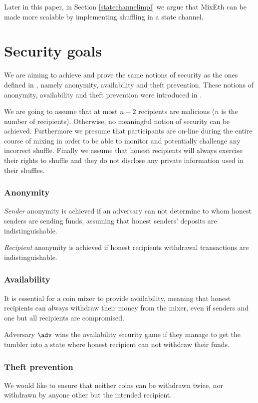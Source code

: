 \documentclass[a4paper]{article}
\theoremstyle{definition}
\begin{document}
Later in this paper, in Section \ref{statechannelimpl} we argue that MixEth can be made more scalable by implementing shuffling in a state channel.   

\section{Security goals} \label{securitygoals}
We are aiming to achieve and prove the same notions of security as the ones defined in \cite{meiklejohn2018mobius}, namely anonymity, availability and theft prevention. These notions of anonymity, availability and theft prevention were introduced in \cite{meiklejohn2018mobius}.

We are going to assume that at most $n-2$ recipients are malicious ($n$ is the number of recipients). Otherwise, no meaningful notion of security can be achieved. Furthermore we presume that participants are on-line during the entire course of mixing in order to be able to monitor and potentially challenge any incorrect shuffle. Finally we assume that honest recipients will always exercise their rights to shuffle and they do not disclose any private information used in their shuffles.

\subsubsection{Anonymity} \label{sec:defanonymity}
\textit{Sender} anonymity is achieved if an adversary can not determine to whom honest senders are sending funds, assuming that honest senders' deposits are indistinguishable.

\textit{Recipient} anonymity is achieved if honest recipients withdrawal transactions are indistinguishable. 

\subsubsection{Availability}
It is essential for a coin mixer to provide availability, meaning that honest recipients can always withdraw their money from the mixer, even if senders and one but all recipients are compromised. 

Adversary $\adv$ wins the availability security game if they manage to get the tumbler into a state where honest recipient can not withdraw their funds.  

\subsubsection{Theft prevention} \label{sec:theftprevention}
We would like to ensure that neither coins can be withdrawn twice, nor withdrawn by anyone other but the intended recipient.
 
\end{document}
